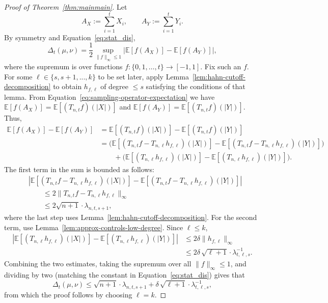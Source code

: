 \documentclass[manuscript,nonacm]{acmart}
\begin{document}
\begin{proof}[Proof of Theorem~\ref{thm:mainmain}]
Let
\[
    A_X:=\sum_{i=1}^t X_i,
    \qquad
    A_Y:=\sum_{i=1}^t Y_i.
\]
By symmetry and Equation~\ref{eq:stat_dis},
\[
    \Delta_t(\mu,\nu)
    =
    \frac12
    \sup_{\|f\|_\infty\le 1}
    \left|
        \mathbb E[f(A_X)]-\mathbb E[f(A_Y)]
    \right|,
\]
where the supremum is over functions $f:\{0,1,\dots,t\}\to[-1,1]$.
Fix such an \(f\).  For some $\ell\in\{s,s+1,...,k\}$ to be set later, apply Lemma~\ref{lem:hahn-cutoff-decomposition} to
obtain \(h_{f,\ell}\) of degree $\leq s$ satisfying the conditions of that lemma. From Equation~\ref{eq:sampling-operator-expectation} we have $\mathbb E[f(A_X)]=\mathbb E[(T_{n,t}f)(|X|)]$ and $\mathbb E[f(A_Y)]=\mathbb E[(T_{n,t}f)(|Y|)]$.
Thus,
\[
\begin{aligned}
    \mathbb E[f(A_X)]-\mathbb E[f(A_Y)]
    &=
    \mathbb E[(T_{n,t}f)(|X|)]
    -
    \mathbb E[(T_{n,t}f)(|Y|)]                                  \\
    &=
    \Big(
        \mathbb E[(T_{n,t}f-T_{n,\ell}h_{f,\ell})(|X|)]
        -
        \mathbb E[(T_{n,t}f-T_{n,\ell}h_{f,\ell})(|Y|)]
    \Big)                                                       \\
    &\qquad
    +
    \Big(
        \mathbb E[(T_{n,\ell}h_{f,\ell})(|X|)]
        -
        \mathbb E[(T_{n,\ell}h_{f,\ell})(|Y|)]
    \Big).
\end{aligned}
\]
The first term in the sum is bounded as follows:
\[
\begin{aligned}
    &
    \left|
        \mathbb E[(T_{n,t}f-T_{n,\ell}h_{f,\ell})(|X|)]
        -
        \mathbb E[(T_{n,t}f-T_{n,\ell}h_{f,\ell})(|Y|)]
    \right|                                                     \\
    &\qquad\le
    2\|T_{n,t}f-T_{n,\ell}h_{f,\ell}\|_\infty                                    \\
    &\qquad\le
    2\sqrt{n+1}\cdot\lambda_{n,t,s+1},
\end{aligned}
\]
where the last step uses Lemma~\ref{lem:hahn-cutoff-decomposition}.
For the second term, use Lemma~\ref{lem:approx-controls-low-degree}.  Since \(\ell\le k\),
\[
\begin{aligned}
    \left|
        \mathbb E[(T_{n,\ell}h_{f,\ell})(|X|)]-\mathbb E[(T_{n,\ell}h_{f,\ell})(|Y|)]
    \right|                                                  
    &\le
    2\delta\|h_{f,\ell}\|_\infty                                      \\
    &\le
    2\delta\,\sqrt{\ell+1}\cdot \lambda^{-1}_{t,\ell,s}.
\end{aligned}
\]
Combining the two estimates, taking the supremum over all \(\|f\|_\infty\le 1\), and dividing by two (matching the constant in Equation~\ref{eq:stat_dis}) gives that 
\begin{equation}
    \label{eq:main_with_lambda}
    \Delta_t(\mu,\nu)\leq \sqrt{n+1}\cdot\lambda_{n,t,s+1}+\delta\,\sqrt{\ell+1}\cdot \lambda^{-1}_{t,\ell,s},
\end{equation}
from which the proof follows by choosing $\ell=k$.
\end{proof}
\end{document}
